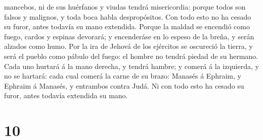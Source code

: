 mancebos, ni de sus huérfanos y viudas tendrá misericordia: porque todos
son falsos y malignos, y toda boca habla despropósitos. Con todo esto no
ha cesado su furor, antes todavía su mano extendida. 
Porque la maldad se encendió como fuego, cardos y espinas devorará; y
encenderáse en lo espeso de la breña, y serán alzados como humo.
 Por la ira de Jehová de los ejércitos se oscureció la
tierra, y será el pueblo como pábulo del fuego: el hombre no tendrá
piedad de su hermano.  Cada uno hurtará á la mano
derecha, y tendrá hambre; y comerá á la izquierda, y no se hartará: cada
cual comerá la carne de su brazo:  Manasés á Ephraim, y
Ephraim á Manasés, y entrambos contra Judá. Ni con todo esto ha cesado
su furor, antes todavía extendida su mano.

\hypertarget{section-9}{%
\section{10}\label{section-9}}

